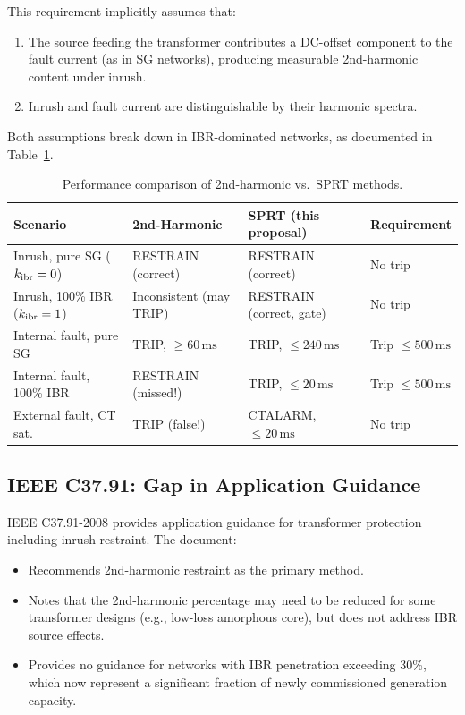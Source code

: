 \documentclass[11pt, a4paper]{article}
\newcommand{\ms}{\,\text{ms}}
\begin{document}
This requirement implicitly assumes that:
\begin{enumerate}[label=(\alph*)]
  \item The source feeding the transformer contributes a DC-offset component
    to the fault current (as in SG networks), producing measurable
    2nd-harmonic content under inrush.
  \item Inrush and fault current are distinguishable by their harmonic
    spectra.
\end{enumerate}

Both assumptions break down in IBR-dominated networks, as documented in
Table~\ref{tab:comparison_methods}.

\begin{table}[htbp]
  \centering
  \caption{Performance comparison of 2nd-harmonic vs.\ SPRT methods.}
  \label{tab:comparison_methods}
  \begin{tabular}{p{4.2cm}p{3.5cm}p{3.5cm}p{3.0cm}}
    \toprule
    \textbf{Scenario} & \textbf{2nd-Harmonic}
      & \textbf{SPRT (this proposal)} & \textbf{Requirement} \\
    \midrule
    Inrush, pure SG ($k_{\rm ibr}=0$)
      & RESTRAIN (correct)
      & RESTRAIN (correct)
      & No trip \\
    Inrush, 100\% IBR ($k_{\rm ibr}=1$)
      & Inconsistent (may TRIP)
      & RESTRAIN (correct, gate)
      & No trip \\
    Internal fault, pure SG
      & TRIP, $\geq 60\ms$
      & TRIP, $\leq 240\ms$
      & Trip $\leq 500\ms$ \\
    Internal fault, 100\% IBR
      & RESTRAIN (missed!)
      & TRIP, $\leq 20\ms$
      & Trip $\leq 500\ms$ \\
    External fault, CT sat.
      & TRIP (false!)
      & CTALARM, $\leq 20\ms$
      & No trip \\
    \bottomrule
  \end{tabular}
\end{table}

\subsection{IEEE C37.91: Gap in Application Guidance}

IEEE C37.91-2008 \cite{IEEEC3791} provides application guidance for
transformer protection including inrush restraint.  The document:
\begin{itemize}
  \item Recommends 2nd-harmonic restraint as the primary method.
  \item Notes that the 2nd-harmonic percentage may need to be reduced for
    some transformer designs (e.g., low-loss amorphous core), but does not
    address IBR source effects.
  \item Provides no guidance for networks with IBR penetration exceeding
    30\%, which now represent a significant fraction of newly commissioned
    generation capacity.
\end{itemize}
\end{document}
